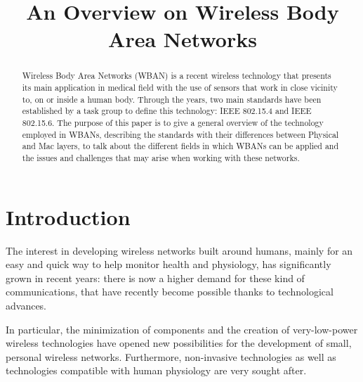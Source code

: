 \documentclass[conference]{IEEEtran}
\begin{document}
\title{An Overview on Wireless Body Area Networks}

\author{
	
}

\maketitle

\begin{abstract}
Wireless Body Area Networks (WBAN) is a recent wireless technology that presents its main application in medical field with the use of sensors that work in close vicinity to, on or inside a human body. Through the years, two main standards have been established by a task group to define this technology: IEEE 802.15.4 and IEEE 802.15.6. The purpose of this paper is to give a general overview of the technology employed in WBANs, describing the standards with their differences between Physical and Mac layers, to talk about the different fields in which WBANs can be applied and the issues and challenges that may arise when working with these networks.
\end{abstract}
\hfill
%

\section{Introduction}
The interest in developing wireless networks built around humans, mainly for an easy and quick way to help monitor health and physiology, has significantly grown in recent years: there is now a higher demand for these kind of communications, that have recently become possible thanks to technological advances.

In particular, the minimization of components and the creation of very-low-power wireless technologies have opened new possibilities for the development of small, personal wireless networks. Furthermore, non-invasive technologies as well as technologies compatible with human physiology are very sought after.
\end{document}
